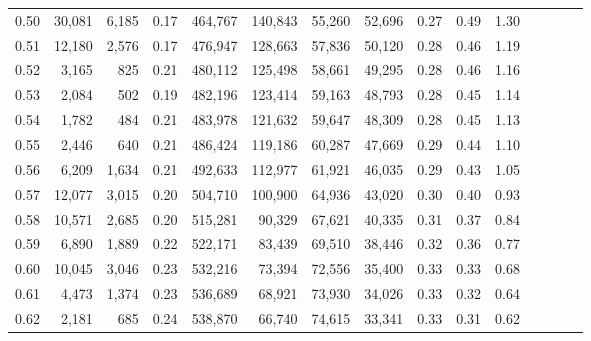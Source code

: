 \begin{tabular}{rrrcrrrrrrrrrrr}
0.50 &  30,081 &  6,185 &                                       0.17 &  464,767 &  140,843 &   55,260 &   52,696 &  0.27 &  0.49 &                         1.30 \\
0.51 &  12,180 &  2,576 &                                       0.17 &  476,947 &  128,663 &   57,836 &   50,120 &  0.28 &  0.46 &                         1.19 \\
0.52 &   3,165 &    825 &                                       0.21 &  480,112 &  125,498 &   58,661 &   49,295 &  0.28 &  0.46 &                         1.16 \\
0.53 &   2,084 &    502 &                                       0.19 &  482,196 &  123,414 &   59,163 &   48,793 &  0.28 &  0.45 &                         1.14 \\
0.54 &   1,782 &    484 &                                       0.21 &  483,978 &  121,632 &   59,647 &   48,309 &  0.28 &  0.45 &                         1.13 \\
0.55 &   2,446 &    640 &                                       0.21 &  486,424 &  119,186 &   60,287 &   47,669 &  0.29 &  0.44 &                         1.10 \\
0.56 &   6,209 &  1,634 &                                       0.21 &  492,633 &  112,977 &   61,921 &   46,035 &  0.29 &  0.43 &                         1.05 \\
0.57 &  12,077 &  3,015 &                                       0.20 &  504,710 &  100,900 &   64,936 &   43,020 &  0.30 &  0.40 &                         0.93 \\
0.58 &  10,571 &  2,685 &                                       0.20 &  515,281 &   90,329 &   67,621 &   40,335 &  0.31 &  0.37 &                         0.84 \\
0.59 &   6,890 &  1,889 &                                       0.22 &  522,171 &   83,439 &   69,510 &   38,446 &  0.32 &  0.36 &                         0.77 \\
0.60 &  10,045 &  3,046 &                                       0.23 &  532,216 &   73,394 &   72,556 &   35,400 &  0.33 &  0.33 &                         0.68 \\
0.61 &   4,473 &  1,374 &                                       0.23 &  536,689 &   68,921 &   73,930 &   34,026 &  0.33 &  0.32 &                         0.64 \\
0.62 &   2,181 &    685 &                                       0.24 &  538,870 &   66,740 &   74,615 &   33,341 &  0.33 &  0.31 &                         0.62 \\

\end{tabular}
